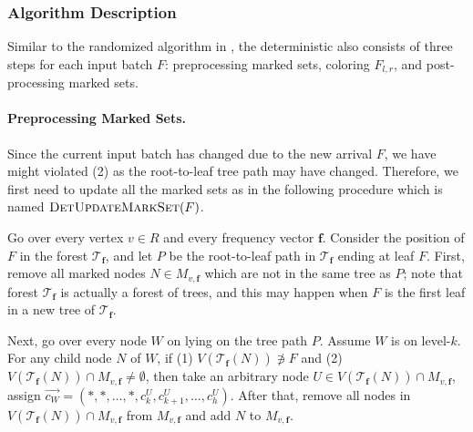 \documentclass[11pt,a4paper]{article}
\newcommand{\tree}{\mathcal{T}}
\newcommand{\freq}{\mathbf{f}}
\begin{document}
\subsubsection{Algorithm Description}
Similar to the randomized algorithm in , the deterministic also consists of three steps for each input batch $F$: preprocessing marked sets, coloring $F_{l, r}$, and post-processing marked sets.

\paragraph*{Preprocessing Marked Sets.} Since the current input batch has changed due to the new arrival $F$, we have might violated (2) as the root-to-leaf tree path may have changed. Therefore, we first need to update all the marked sets as in the following procedure which is named $\textsc{DetUpdateMarkSet}(F)$\label{alg:detupdatemarkset}.

Go over every vertex $v\in R$ and every frequency vector $\freq$. Consider the position of $F$ in the forest $\tree_\freq$, and let $P$ be the root-to-leaf path in $\tree_{\freq}$ ending at leaf $F$. First, remove all marked nodes $N\in M_{v, \freq}$ which are not in the same tree as $P$; note that forest $\tree_\freq$ is actually a forest of trees, and this may happen when $F$ is the first leaf in a new tree of $\tree_{\freq}$.

Next, go over every node $W$ on lying on the tree path $P$. Assume $W$ is on level-$k$. For any child node $N$ of $W$, if (1) $V(\tree_\freq(N)) \not\ni F$ and (2) $V(\tree_\freq(N))\cap M_{v, \freq} \neq \emptyset$, then take an arbitrary node $U\in V(\tree_\freq(N))\cap M_{v, \freq}$, assign $\overrightarrow{c_W} = \left(*, *, \ldots, *, c_{k}^U, c_{k+1}^U, \ldots, c_h^U\right)$. After that, remove all nodes in $V(\tree_\freq(N))\cap M_{v, \freq}$ from $M_{v, \freq}$ and add $N$ to $M_{v, \freq}$. 
\end{document}
